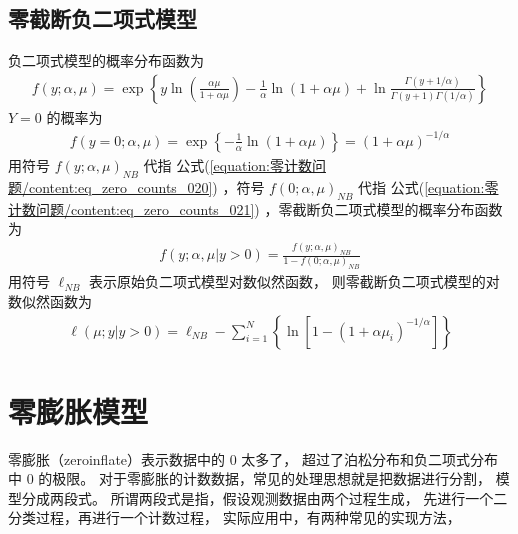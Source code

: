 \documentclass[letterpaper,10pt,english]{sphinxmanual}
\begin{document}
\subsection{零截断负二项式模型}
\label{\detokenize{_u96f6_u8ba1_u6570_u95ee_u9898/content:id4}}
负二项式模型的概率分布函数为
\begin{equation}\label{equation:零计数问题/content:eq_zero_counts_020}
\begin{split}f(y;\alpha,\mu)  = \exp \left \{
y \ln \left (\frac{\alpha \mu}{1+\alpha \mu} \right )
- \frac{1}{\alpha} \ln (1+\alpha \mu) + \ln \frac{\Gamma(y+1/\alpha)  }{\Gamma(y+1) \Gamma(1/\alpha) }
\right \}\end{split}
\end{equation}
\(Y=0\) 的概率为
\begin{equation}\label{equation:零计数问题/content:eq_zero_counts_021}
\begin{split}f(y=0;\alpha,\mu) = \exp \left \{- \frac{1}{\alpha} \ln (1+\alpha \mu) \right \}
=  (1+\alpha \mu)^{-1/\alpha}\end{split}
\end{equation}
用符号 \(f(y;\alpha,\mu)_{NB}\) 代指 公式(\ref{equation:零计数问题/content:eq_zero_counts_020})
，符号 \(f(0;\alpha,\mu)_{NB}\) 代指 公式(\ref{equation:零计数问题/content:eq_zero_counts_021})
，零截断负二项式模型的概率分布函数为
\begin{equation}\label{equation:零计数问题/content:eq_zero_counts_023}
\begin{split}f(y;\alpha,\mu|y>0) = \frac{f(y;\alpha,\mu)_{NB}}{1-f(0;\alpha,\mu)_{NB}}\end{split}
\end{equation}
用符号 \(\ell_{NB}\) 表示原始负二项式模型对数似然函数，
则零截断负二项式模型的对数似然函数为
\begin{equation}\label{equation:零计数问题/content:零计数问题/content:0}
\begin{split}\ell(\mu;y|y>0) =  \ell_{NB} -  \sum_{i=1}^N
\left \{
    \ln [  1-   (1+\alpha \mu_i)^{-1/\alpha}  ]
 \right \}\end{split}
\end{equation}

\section{零膨胀模型}
\label{\detokenize{_u96f6_u8ba1_u6570_u95ee_u9898/content:id5}}
零膨胀（zero\sphinxhyphen{}inflate）表示数据中的 \(0\) 太多了，
超过了泊松分布和负二项式分布中 \(0\) 的极限。
对于零膨胀的计数数据，常见的处理思想就是把数据进行分割，
模型分成两段式。
所谓两段式是指，假设观测数据由两个过程生成，
先进行一个二分类过程，再进行一个计数过程，
实际应用中，有两种常见的实现方法，
\end{document}
